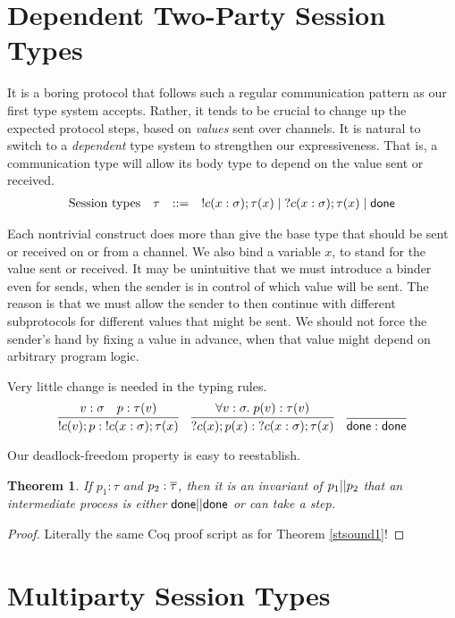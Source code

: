 \documentclass{amsbook}
\newtheorem{theorem}{Theorem}[chapter]
\theoremstyle{definition}
\theoremstyle{remark}
\numberwithin{section}{chapter}
\numberwithin{equation}{chapter}
\begin{document}
\section{Dependent Two-Party Session Types}

It is a boring protocol that follows such a regular communication pattern as our first type system accepts.
Rather, it tends to be crucial to change up the expected protocol steps, based on \emph{values} sent over channels.
It is natural to switch to a \emph{dependent} type system to strengthen our expressiveness.
That is, a communication type will allow its body type to depend on the value sent or received.
$$\begin{array}{rrcl}
  \textrm{Session types} & \tau &::=& !c(x : \sigma); \tau(x) \mid \; ?c(x : \sigma); \tau(x) \mid \mathsf{done}
\end{array}$$

Each nontrivial construct does more than give the base type that should be sent or received on or from a channel.
We also bind a variable $x$, to stand for the value sent or received.
It may be unintuitive that we must introduce a binder even for sends, when the sender is in control of which value will be sent.
The reason is that we must allow the sender to then continue with different subprotocols for different values that might be sent.
We should not force the sender's hand by fixing a value in advance, when that value might depend on arbitrary program logic.

Very little change is needed in the typing rules.
$$\infer{\send{c}{v}{p} : \; \send{c}{x : \sigma}{\tau(x)}}{
  v : \sigma
  & p : \tau(v)
}
\quad \infer{\recv{c}{x}{p(x)} : \; \recv{c}{x : \sigma}{\tau(x)}}{
  \forall v : \sigma. \; p(v) : \tau(v)
}
\quad \infer{\done : \done}{}$$

Our deadlock-freedom property is easy to reestablish.

\begin{theorem}
  If $p_1 : \tau$ and $p_2 : \overline{\tau}$, then it is an invariant of $p_1 || p_2$ that an intermediate process is either $\mathsf{done} || \mathsf{done}$ or can take a step.
\end{theorem}
\begin{proof}
  Literally the same Coq proof script as for Theorem \ref{stsound1}!
\end{proof}

\section{Multiparty Session Types}
\end{document}
